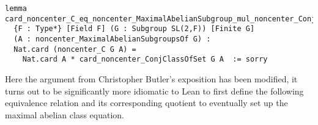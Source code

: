 \begin{footnotesize}
\begin{verbatim}
lemma card_noncenter_C_eq_noncenter_MaximalAbelianSubgroup_mul_noncenter_ConjClassOfSet
  {F : Type*} [Field F] (G : Subgroup SL(2,F)) [Finite G]
  (A : noncenter_MaximalAbelianSubgroupsOf G) :
  Nat.card (noncenter_C G A) =
    Nat.card A * card_noncenter_ConjClassOfSet G A  := sorry
\end{verbatim}
\end{footnotesize}

Here the argument from Christopher Butler's exposition has been modified, it turns out to be significantly more
idiomatic to Lean to first define the following equivalence relation and its corresponding quotient to eventually set up
the maximal abelian class equation.

